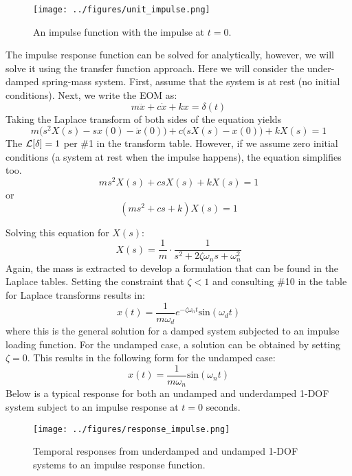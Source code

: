 \documentclass[12pt,letter]{article}
\begin{document}
\begin{figure}[H]
	\centering
	\texttt{[image: ../figures/unit\_impulse.png]}
	\caption{An impulse function with the impulse at $t=0$. }
\end{figure}

The impulse response function can be solved for analytically, however, we will solve it using the transfer function approach. Here we will consider the under-damped spring-mass system. First, assume that the system is at rest (no initial conditions). Next, we write the EOM as:
\begin{equation}
m\ddot{x} +c\dot{x} +kx = \delta(t)
\end{equation}
Taking the Laplace transform of both sides of the equation yields 
\begin{equation}
m\big(s^2X(s)-sx(0) - \dot{x}(0)\big) + c\big(sX(s)-x(0)\big) +kX(s) =1
\end{equation}
The $\mathcal{L}{\left[\delta\right]}=1$ per \#1 in the transform table. However, if we assume zero initial conditions (a system at rest when the impulse happens), the equation simplifies too. 
\begin{equation}
ms^2X(s) + csX(s) +kX(s) =1
\end{equation}
or
\begin{equation}
(ms^2 + cs +k)X(s) =1
\end{equation}

Solving this equation for $X(s)$:
\begin{equation}
X(s) = \frac{1}{m} \cdot \frac{1}{s^2 + 2 \zeta \omega_n s + \omega_n^2}
\end{equation}
Again, the mass is extracted to develop a formulation that can be found in the Laplace tables. Setting the constraint that $\zeta<1$ and consulting \#10 in the table for Laplace transforms results in:
\begin{equation}
x(t) = \frac{1}{m \omega_d} e^{-\zeta \omega_n t} \text{sin}(\omega_dt)
\label{eq:impulse_load_damped}
\end{equation}
where this is the general solution for a damped system subjected to an impulse loading function. For the undamped case, a solution can be obtained by setting $\zeta=0$. This results in the following form for the undamped case:
\begin{equation}
x(t) = \frac{1}{m \omega_n}\text{sin}(\omega_n t)
\end{equation}
Below is a typical response for both an undamped and underdamped 1-DOF system subject to an impulse response at $t=0$ seconds. 
\begin{figure}[H]
	\centering
	\vspace{-2ex}
	\texttt{[image: ../figures/response\_impulse.png]}
	\vspace{-3ex}
	\caption{Temporal responses from underdamped and undamped 1-DOF systems to an impulse response function.}
\end{figure}
\end{document}
